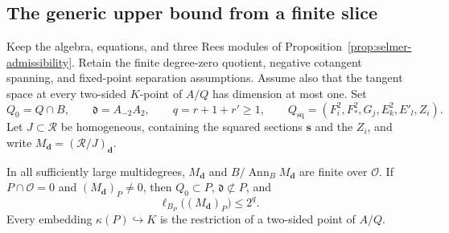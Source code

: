 \subsection{The generic upper bound from a finite slice}
\label{subsec:selmer-upper-multiplicity}

Keep the algebra, equations, and three Rees modules of
Proposition~\ref{prop:selmer-admissibility}. Retain the finite
degree-zero quotient, negative cotangent spanning, and fixed-point
separation assumptions. Assume also that the tangent space at every
two-sided $K$-point of $A/Q$ has dimension at most one. Set
\[
 Q_0=Q\cap B,\qquad \mathfrak d=A_{-2}A_2,\qquad q=r+1+r'\ge1,
 \qquad Q_{\mathrm{sq}}=(F_i^2,F_*^2,G_j,E_k^2,E'_l,Z_i).
\]
Let $J\subset\mathcal R$ be homogeneous, containing the squared
sections $\boldsymbol s$ and the $Z_i$, and write
$M_{\boldsymbol d}=(\mathcal R/J)_{\boldsymbol d}$.

\begin{proposition}
\label{prop:selmer-generic-multiplicity}
In all sufficiently large multidegrees, $M_{\boldsymbol d}$ and
$B/\operatorname{Ann}_B M_{\boldsymbol d}$ are finite over
$\mathcal O$. If $P\cap\mathcal O=0$ and
$(M_{\boldsymbol d})_P\ne0$, then $Q_0\subset P$,
$\mathfrak d\not\subset P$, and
\[
 \ell_{B_P}\bigl((M_{\boldsymbol d})_P\bigr)\le2^q.
\]
Every embedding $\kappa(P)\hookrightarrow K$ is the restriction of
a two-sided point of $A/Q$.
\end{proposition}

